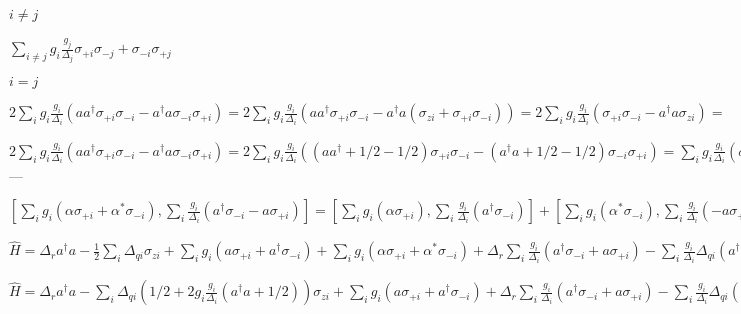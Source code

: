 $i \neq j$

$ \sum\limits_{i \neq j} g_i \frac{g_j} {\Delta_j} \sigma_{+i} \sigma_{-j} + \sigma_{-i} \sigma_{+j} $

$i = j$

$ 
2 \sum\limits_i g_i \frac{g_i} {\Delta_i} (a a^\dagger \sigma_{+i} \sigma_{-i} - a^\dagger a \sigma_{-i} \sigma_{+i}) =
2 \sum\limits_i g_i \frac{g_i} {\Delta_i} (a a^\dagger \sigma_{+i} \sigma_{-i} - a^\dagger a (\sigma_{zi} + \sigma_{+i} \sigma_{-i})) =
2 \sum\limits_i g_i \frac{g_i} {\Delta_i} (\sigma_{+i} \sigma_{-i} - a^\dagger a \sigma_{zi}) =
$

$ 2 \sum\limits_i g_i \frac{g_i} {\Delta_i} (a a^\dagger \sigma_{+i} \sigma_{-i} - a^\dagger a \sigma_{-i} \sigma_{+i}) =
2 \sum\limits_i g_i \frac{g_i} {\Delta_i} ((a a^\dagger + 1/2 - 1/2) \sigma_{+i} \sigma_{-i} - (a^\dagger a + 1/2 - 1/2) \sigma_{-i} \sigma_{+i}) =
\sum\limits_i g_i \frac{g_i} {\Delta_i} (\sigma_{+i} \sigma_{-i} + \sigma_{-i} \sigma_{+i}) -
2 \sum\limits_i g_i \frac{g_i} {\Delta_i} (a^\dagger a + 1/2) \sigma_{zi} =
\sum\limits_i (g_i \frac{g_i} {\Delta_i} - 2 g_i \frac{g_i} {\Delta_i} (a^\dagger a + 1/2) \sigma_{zi}) $
---


$ [\sum\limits_i g_i (\alpha \sigma_{+i} + \alpha^* \sigma_{-i}), \sum\limits_i \frac{g_i} {\Delta_i} (a^\dagger \sigma_{-i} - a \sigma_{+i})] =
[\sum\limits_i g_i (\alpha \sigma_{+i}), \sum\limits_i \frac{g_i} {\Delta_i} (a^\dagger \sigma_{-i})] +
[\sum\limits_i g_i (\alpha^* \sigma_{-i}), \sum\limits_i \frac{g_i} {\Delta_i} (- a \sigma_{+i})] =
- \sum\limits_i g_i \frac{g_i} {\Delta_i} (\alpha a^\dagger + \alpha^* a) \sigma_{zi} $


$\hat{H} = \Delta_r a^\dagger a - \frac{1}{2} \sum\limits_i \Delta_{qi}
\sigma_{zi} + \sum\limits_i g_i (a \sigma_{+i} + a^\dagger \sigma_{-i}) +
\sum\limits_i g_i (\alpha \sigma_{+i} + \alpha^* \sigma_{-i}) +
\Delta_r \sum\limits_i \frac{g_i} {\Delta_i} (a^\dagger \sigma_{-i} + a \sigma_{+i}) -
\sum\limits_i \frac{g_i} {\Delta_i} \Delta_{qi} (a^\dagger \sigma_{-i} + a \sigma_{+i}) +
\sum\limits_{i \neq j} g_i \frac{g_j} {\Delta_j} \sigma_{+i} \sigma_{-j} + \sigma_{-i} \sigma_{+j} +
\sum\limits_i (g_i \frac{g_i} {\Delta_i} - 2 g_i \frac{g_i} {\Delta_i} (a^\dagger a + 1/2) \sigma_{zi}) -
\sum\limits_i g_i \frac{g_i} {\Delta_i} (\alpha a^\dagger + \alpha^* a) \sigma_{zi} 
$

$\hat{H} = \Delta_r a^\dagger a - \sum\limits_i \Delta_{qi} (1/2 + 2 g_i \frac{g_i} {\Delta_i} (a^\dagger a + 1/2))
\sigma_{zi} + \sum\limits_i g_i (a \sigma_{+i} + a^\dagger \sigma_{-i}) +
\Delta_r \sum\limits_i \frac{g_i} {\Delta_i} (a^\dagger \sigma_{-i} + a \sigma_{+i}) -
\sum\limits_i \frac{g_i} {\Delta_i} \Delta_{qi} (a^\dagger \sigma_{-i} + a \sigma_{+i}) +
\sum\limits_{i \neq j} g_i \frac{g_j} {\Delta_j} \sigma_{+i} \sigma_{-j} + \sigma_{-i} \sigma_{+j} +
\sum\limits_i g_i (\alpha \sigma_{+i} + \alpha^* \sigma_{-i}) -
\sum\limits_i g_i \frac{g_i} {\Delta_i} (\alpha a^\dagger + \alpha^* a) \sigma_{zi} 
$


